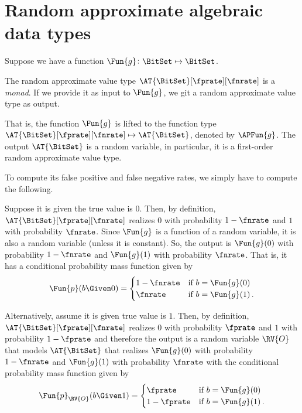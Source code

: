 \documentclass[ ../main.tex]{subfiles}
\begin{document}
\section{Random approximate algebraic data types}
Suppose we have a function $\Fun{g} \colon \BitSet \mapsto \BitSet$.

The random approximate value type $\AT{\BitSet}[\fprate][\fnrate]$ is a \emph{monad}.
If we provide it as input to $\Fun{g}$, we git a random approximate value type as output.

That is, the function $\Fun{g}$ is lifted to the function type $\AT{\BitSet}[\fprate][\fnrate] \mapsto \AT{\BitSet}$, denoted by $\APFun{g}$.
The output $\AT{\BitSet}$ is a random variable, in particular, it is a first-order random approximate value type.

To compute its false positive and false negative rates, we simply have to compute the following.

Suppose it is given the true value is $0$.
Then, by definition, $\AT{\BitSet}[\fprate][\fnrate]$ realizes $0$ with probability $1-\fnrate$ and $1$ with probability $\fnrate$.
Since $\Fun{g}$ is a function of a random variable, it is also a random variable (unless it is constant).
So, the output is $\Fun{g}(0)$ with probability $1-\fnrate$ and $\Fun{g}(1)$ with probability $\fnrate$.
That is, it has a conditional probability mass function given by
\begin{equation}
\Fun{p}(b \Given 0) =
\begin{cases}
1-\fnrate 	& \text{if $b = \Fun{g}(0)$} \\
\fnrate	 	& \text{if $b = \Fun{g}(1)$}\,.
\end{cases}
\end{equation}

Alternatively, assume it is given true value is $1$.
Then, by definition, $\AT{\BitSet}[\fprate][\fnrate]$ realizes $0$ with probability $\fprate$ and $1$ with probability $1-\fprate$ and therefore the output is a random variable $\RV{O}$ that models $\AT{\BitSet}$ that realizes $\Fun{g}(0)$ with probability $1-\fnrate$ and $\Fun{g}(1)$ with probability $\fnrate$ with the conditional probability mass function given by
\begin{equation}
\Fun{p}_{\RV{O}}(b \Given 1) =
\begin{cases}
\fprate 	& \text{if $b = \Fun{g}(0)$} \\
1-\fprate	& \text{if $b = \Fun{g}(1)$}\,.
\end{cases}
\end{equation}
\end{document}
